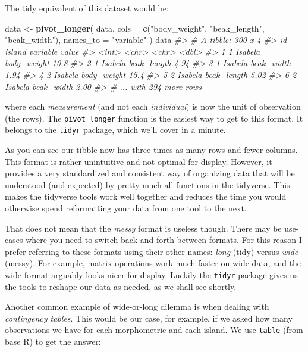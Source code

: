 \documentclass[]{book}
\newenvironment{Shaded}{}{}
\newcommand{\CommentTok}[1]{\textcolor[rgb]{0.38,0.63,0.69}{\textit{#1}}}
\newcommand{\DataTypeTok}[1]{\textcolor[rgb]{0.56,0.13,0.00}{#1}}
\newcommand{\KeywordTok}[1]{\textcolor[rgb]{0.00,0.44,0.13}{\textbf{#1}}}
\newcommand{\NormalTok}[1]{#1}
\newcommand{\StringTok}[1]{\textcolor[rgb]{0.25,0.44,0.63}{#1}}
\begin{document}
The tidy equivalent of this dataset would be:

\begin{Shaded}
\begin{Highlighting}[]
\NormalTok{data <-}\StringTok{ }\KeywordTok{pivot_longer}\NormalTok{(}
\NormalTok{  data,}
  \DataTypeTok{cols =} \KeywordTok{c}\NormalTok{(}\StringTok{"body_weight"}\NormalTok{, }\StringTok{"beak_length"}\NormalTok{, }\StringTok{"beak_width"}\NormalTok{),}
  \DataTypeTok{names_to =} \StringTok{"variable"}
\NormalTok{)}
\NormalTok{data}
\CommentTok{#> # A tibble: 300 x 4}
\CommentTok{#>      id island  variable    value}
\CommentTok{#>   <int> <chr>   <chr>       <dbl>}
\CommentTok{#> 1     1 Isabela body_weight 10.8 }
\CommentTok{#> 2     1 Isabela beak_length  4.94}
\CommentTok{#> 3     1 Isabela beak_width   1.94}
\CommentTok{#> 4     2 Isabela body_weight 15.4 }
\CommentTok{#> 5     2 Isabela beak_length  5.02}
\CommentTok{#> 6     2 Isabela beak_width   2.00}
\CommentTok{#> # ... with 294 more rows}
\end{Highlighting}
\end{Shaded}

where each \emph{measurement} (and not each \emph{individual}) is now the unit of observation (the rows). The \texttt{pivot\_longer} function is the easiest way to get to this format. It belongs to the \texttt{tidyr} package, which we'll cover in a minute.

As you can see our tibble now has three times as many rows and fewer columns. This format is rather unintuitive and not optimal for display. However, it provides a very standardized and consistent way of organizing data that will be understood (and expected) by pretty much all functions in the tidyverse. This makes the tidyverse tools work well together and reduces the time you would otherwise spend reformatting your data from one tool to the next.

That does not mean that the \emph{messy} format is useless though. There may be use-cases where you need to switch back and forth between formats. For this reason I prefer referring to these formats using their other names: \emph{long} (tidy) versus \emph{wide} (messy). For example, matrix operations work much faster on wide data, and the wide format arguably looks nicer for display. Luckily the \texttt{tidyr} package gives us the tools to reshape our data as needed, as we shall see shortly.

Another common example of wide-or-long dilemma is when dealing with \emph{contingency tables}. This would be our case, for example, if we asked how many observations we have for each morphometric and each island. We use \texttt{table} (from base R) to get the answer:
\end{document}
